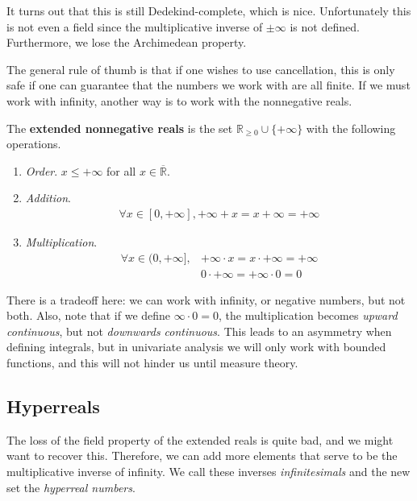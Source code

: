   It turns out that this is still Dedekind-complete, which is nice. Unfortunately this is not even a field since the multiplicative inverse of $\pm \infty$ is not defined. Furthermore, we lose the Archimedean property. 

  The general rule of thumb is that if one wishes to use cancellation, this is only safe if one can guarantee that the numbers we work with are all finite. If we must work with infinity, another way is to work with the nonnegative reals. 

  \begin{definition}
    The \textbf{extended nonnegative reals} is the set $\mathbb{R}_{\geq 0} \cup \{+\infty\}$ with the following operations. 
    \begin{enumerate}
      \item \textit{Order}. $x \leq +\infty$ for all $x \in \overline{\mathbb{R}}$. 
      \item \textit{Addition}. 
      \begin{align}
        \forall x \in [0, +\infty], +\infty + x = x + \infty = +\infty 
      \end{align}
    \item \textit{Multiplication}.
      \begin{align}
        \forall x \in (0, +\infty], & +\infty \cdot x = x \cdot +\infty = +\infty \\ 
                                    & 0 \cdot +\infty = +\infty \cdot 0 = 0 
      \end{align}
    \end{enumerate}
  \end{definition} 

  There is a tradeoff here: we can work with infinity, or negative numbers, but not both. Also, note that if we define $\infty \cdot 0 = 0$, the multiplication becomes \textit{upward continuous}, but not \textit{downwards continuous}. This leads to an asymmetry when defining integrals, but in univariate analysis we will only work with bounded functions, and this will not hinder us until measure theory. 

\subsection{Hyperreals}

  The loss of the field property of the extended reals is quite bad, and we might want to recover this. Therefore, we can add more elements that serve to be the multiplicative inverse of infinity. We call these inverses \textit{infinitesimals} and the new set the \textit{hyperreal numbers}. 

